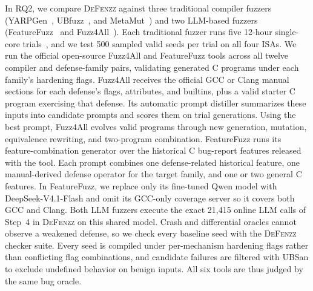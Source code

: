 \documentclass[conference,compsoc]{IEEEtran}
\begin{document}
In RQ2, we compare \textsc{DeFenzz} against three traditional compiler fuzzers (YARPGen~\cite{livinskii2020yarpgen}, UBfuzz~\cite{li2024ubfuzz}, and MetaMut~\cite{ou2024metamut}) and two LLM-based fuzzers (FeatureFuzz~\cite{he2026featurefuzz} and Fuzz4All~\cite{xia2024fuzz4all}). Each traditional fuzzer runs five 12-hour single-core trials~\cite{klees2018fuzzeval}, and we test 500 sampled valid seeds per trial on all four ISAs. We run the official open-source Fuzz4All and FeatureFuzz tools across all twelve compiler and defense-family pairs, validating generated C programs under each family's hardening flags. Fuzz4All receives the official GCC or Clang manual sections for each defense's flags, attributes, and builtins, plus a valid starter C program exercising that defense. Its automatic prompt distiller summarizes these inputs into candidate prompts and scores them on trial generations. Using the best prompt, Fuzz4All evolves valid programs through new generation, mutation, equivalence rewriting, and two-program combination. FeatureFuzz runs its feature-combination generator over the historical C bug-report features released with the tool. Each prompt combines one defense-related historical feature, one manual-derived defense operator for the target family, and one or two general C features. In FeatureFuzz, we replace only its fine-tuned Qwen model with DeepSeek-V4.1-Flash and omit its GCC-only coverage server so it covers both GCC and Clang. Both LLM fuzzers execute the exact 21,415 online LLM calls of Step~4 in \textsc{DeFenzz} on this shared model. Crash and differential oracles cannot observe a weakened defense, so we check every baseline seed with the \textsc{DeFenzz} checker suite. Every seed is compiled under per-mechanism hardening flags rather than conflicting flag combinations, and candidate failures are filtered with UBSan to exclude undefined behavior on benign inputs. All six tools are thus judged by the same bug oracle.
\end{document}
